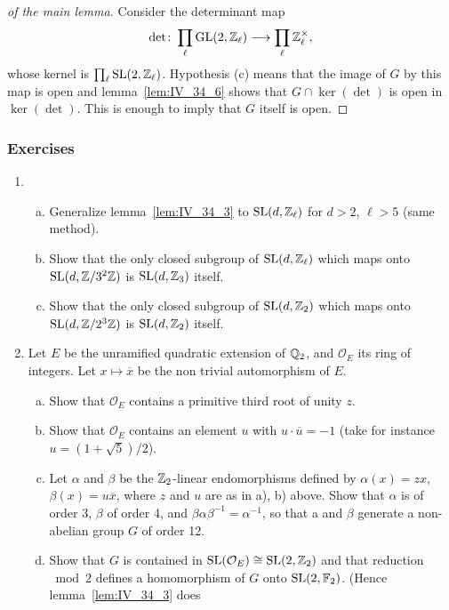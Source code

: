 \begin{proof}[ of the main lemma]
	Consider the determinant map
	\[
		\det\colon \prod_{\ell} \operatorname{GL}(2, \mathbb{Z}_\ell) \longrightarrow
		\prod_{\ell} \mathbb{Z}_\ell^\times,
	\]
	whose kernel is $\prod_\ell \operatorname{SL}(2, \mathbb{Z}_\ell)$. Hypothesis (c) means that
	the image of $G$ by this map is open and lemma~\ref{lem:IV_34_6} shows
	that $G \cap \ker(\det)$ is open in $\ker(\det)$. This is enough to
	imply that $G$ itself is open.
\end{proof}

\subsubsection*{Exercises}
\begin{enumerate}
\item
	\begin{enumerate}[a)]
		\item Generalize lemma~\ref{lem:IV_34_3} to $\operatorname{SL}(d, \mathbb{Z}_\ell)$
			for $d > 2$, $\ell > 5$ (same method).
		\item Show that the only closed subgroup of $\operatorname{SL}(d, \mathbb{Z}_\ell)$
			which maps onto $\operatorname{SL}(d, \mathbb{Z}/3^2\mathbb{Z})$ is $\operatorname{SL}(d, \mathbb{Z}_3)$
			itself.
		\item Show that the only closed subgroup of $\operatorname{SL}(d, \mathbb{Z}_2)$
			which maps onto $\operatorname{SL}(d, \mathbb{Z}/2^3\mathbb{Z})$ is $\operatorname{SL}(d, \mathbb{Z}_2)$
			itself.
	\end{enumerate}
\item Let $E$ be the unramified quadratic extension of $\mathbb{Q}_2$, and
	\dpage
	$\mathcal{O}_E$ its ring of integers. Let $x \mapsto \overline{x}$ be
	the non trivial automorphism of $E$.
\begin{enumerate}[a)]
	\item Show that $\mathcal{O}_E$ contains a primitive third root of
		unity $z$.
	\item Show that $\mathcal{O}_E$ contains an element $u$ with $u \cdot
		\overline{u} = -1$ (take for instance $u = (1 + \sqrt{5})/2$).
	\item Let $\alpha$ and $\beta$ be the $\mathbb{Z}_2$-linear endomorphisms
		defined by $\alpha(x) = zx$, $\beta(x) = u\overline{x}$, where
		$z$ and $u$ are as in a), b) above. Show that $\alpha$ is of
		order 3, $\beta$ of order 4, and $\beta \alpha \beta^{-1} =
		\alpha^{-1}$, so that a and $\beta$ generate a non-abelian
		group $G$ of order 12.
	\item Show that $G$ is contained in $\operatorname{SL}(\mathcal{O}_E) \cong \operatorname{SL}(2,
		\mathbb{Z}_2)$ and that reduction $\bmod 2$ defines a homomorphism of
		$G$ onto $\operatorname{SL}(2, \mathbb{F}_2)$.  (Hence lemma~\ref{lem:IV_34_3} does

\end{enumerate}
\end{enumerate}
